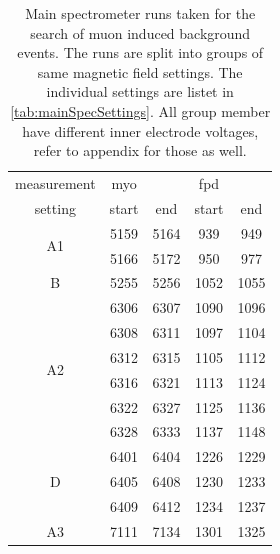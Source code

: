 \begin{table}
	\centering
	\begin{tabular}{|c|cc|cc|}
		\hline
		measurement & myo & & fpd & \\
		setting& start & end & start & end\\
		\hline
		\multirow{2}{*}{A1} & 5159 & 5164 & 939 & 949 \\
		 & 5166 & 5172 & 950 & 977\\
		\hline
		\multirow{1}{*}{B} &5255 & 5256 & 1052 & 1055\\
		\hline
		\multirow{6}{*}{A2}& 6306 & 6307 & 1090 & 1096\\
		& 6308 & 6311 & 1097 & 1104\\
		& 6312 & 6315 & 1105 & 1112\\
		& 6316 & 6321 & 1113 & 1124\\
		& 6322 & 6327 & 1125 & 1136\\
		& 6328 & 6333 & 1137 & 1148\\
		\hline
		
		\multirow{3}{*}{D}& 6401 & 6404 & 1226 & 1229\\
		& 6405 & 6408 & 1230 & 1233\\
		& 6409 & 6412 & 1234 & 1237\\
		\hline
		
		
		
		A3& 7111 & 7134 & 1301 & 1325\\
		\hline
	\end{tabular}
	\caption[Main spectrometer runs]{Main spectrometer runs taken for the search of muon induced background events. The runs are split into groups of same magnetic field settings. The individual settings are listet in \ref{tab:mainSpecSettings}. All group member have different inner electrode voltages, refer to appendix for those as well.}
	\label{tab:mainSpecRuns}
\end{table}

